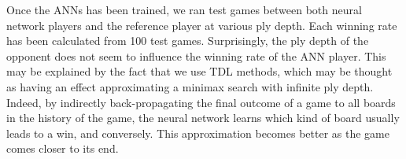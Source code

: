 \documentclass[a4paper, 9pt, twoside, twocolumn]{article}
\begin{document}
Once the ANNs has been trained, we ran test games between both neural network
players and the reference player at various ply depth. Each winning rate has
been calculated from 100 test games. Surprisingly, the ply depth of the opponent
does not seem to influence the winning rate of the ANN player. This may be
explained by the fact that we use TDL methods, which may be thought as having an effect
approximating a minimax search with infinite ply depth. Indeed, by indirectly
back-propagating the final outcome of a game to all boards in the history of the
game, the neural network learns which kind of board usually leads to a win, and
conversely. This approximation becomes better as the game comes closer to
its end.

\newpage
\footnotesize


\end{document}
